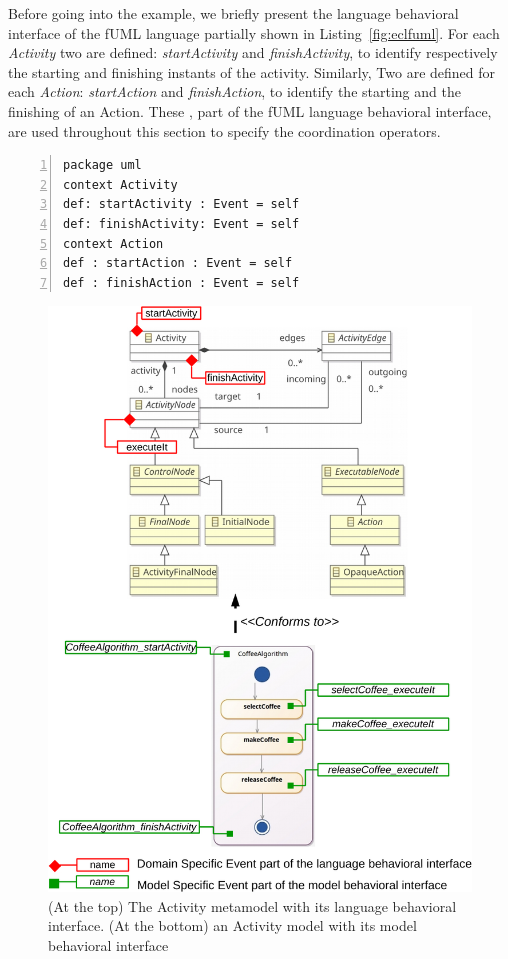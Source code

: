 Before going into the example, we briefly present the language behavioral interface of the fUML language partially shown in  Listing~\ref{fig:eclfuml}. For each \emph{Activity} two \dse are defined: \emph{startActivity} and \emph{finishActivity}, to identify respectively the starting and finishing instants of the activity. Similarly, Two \dse are defined for each \emph{Action}: \emph{startAction} and \emph{finishAction}, to identify the starting and the finishing of an Action. These \dse, part of the fUML language behavioral interface, are used throughout this section to specify the coordination operators.

\begin{lstlisting}[language=ecl,
caption={Partial \ecl specification of Activity Diagram},
label={fig:eclfuml}, 
basicstyle=\scriptsize\ttfamily, backgroundcolor=\color{LGrey}, numbers=left, xleftmargin=3pt, belowskip=-0.4em]
package uml
context Activity
def: startActivity : Event = self
def: finishActivity: Event = self
context Action
def : startAction : Event = self
def : finishAction : Event = self
\end{lstlisting}

\begin{figure}
	\begin{center}
		\includegraphics[width=1\textwidth]{bcool/figs/activitylang}
		\caption{(At the top) The Activity metamodel with its language behavioral interface. (At the bottom) an Activity model with its model behavioral interface}
		\label{fig:tfsmmm}
	\end{center}
\end{figure}
